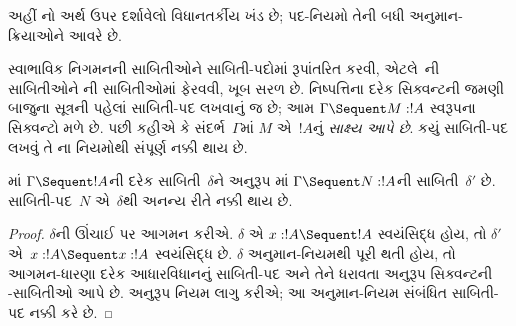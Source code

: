 \begingroup
\makeatletter{}\makeatother


\label{guunit:OLP-0689}


અહીં નો અર્થ ઉપર દર્શાવેલો વિધાનતર્કીય
ખંડ છે; પદ-નિયમો તેની બધી અનુમાન-ક્રિયાઓને આવરે છે.

સ્વાભાવિક નિગમનની સાબિતીઓને સાબિતી-પદોમાં
રૂપાંતરિત કરવી, એટલે~ની સાબિતીઓને
ની સાબિતીઓમાં ફેરવવી, ખૂબ
સરળ છે. નિષ્પત્તિના દરેક સિક્વન્ટની
જમણી બાજુના સૂત્રની પહેલાં
સાબિતી-પદ લખવાનું જ છે; આમ
$\Gamma \Sequent M : !A$ સ્વરૂપના
સિક્વન્ટો મળે છે. પછી કહીએ કે
સંદર્ભ~$\Gamma$માં $M$ એ~$!A$નું
\emph{સાક્ષ્ય આપે છે}. કયું સાબિતી-પદ
લખવું તે ના નિયમોથી
સંપૂર્ણ નક્કી થાય છે.

\begin{prop}
માં $\Gamma \Sequent !A$ની
દરેક સાબિતી~$\delta$ને અનુરૂપ
માં $\Gamma \Sequent N : !A$ની
સાબિતી~$\delta'$ છે. સાબિતી-પદ~$N$
એ~$\delta$થી અનન્ય રીતે નક્કી થાય છે.
\end{prop}

\begin{proof}
$\delta$ની ઊંચાઈ પર આગમન કરીએ.
$\delta$ એ $x:!A \Sequent !A$ સ્વયંસિદ્ધ હોય,
તો $\delta'$ એ~$x:!A \Sequent x:!A$
સ્વયંસિદ્ધ છે. $\delta$ અનુમાન-નિયમથી
પૂરી થતી હોય, તો આગમન-ધારણા દરેક
આધારવિધાનનું સાબિતી-પદ અને તેને ધરાવતા
અનુરૂપ સિક્વન્ટની -સાબિતીઓ
આપે છે. અનુરૂપ  નિયમ
લાગુ કરીએ; આ  અનુમાન-નિયમ સંબંધિત
સાબિતી-પદ નક્કી કરે છે.
\end{proof}

